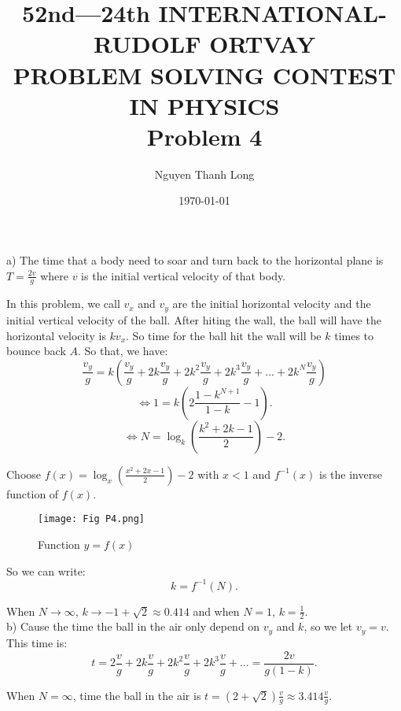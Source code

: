 \documentclass[12pt]{article}
\title{52nd—24th INTERNATIONAL-RUDOLF ORTVAY \\ PROBLEM SOLVING CONTEST IN PHYSICS \\ Problem 4}
\author{Nguyen Thanh Long}
\date{\today}
\begin{document}
	
\maketitle
	
a) The time that a body need to soar and turn back to the horizontal plane is $T = \frac{2v}{g}$ where $v$ is the initial vertical velocity of that body.

In this problem, we call $v_x$ and $v_y$ are the initial horizontal velocity and the initial vertical velocity of the ball. After hiting the wall, the ball will have the horizontal velocity is $k v_x$. So time for the ball hit the wall will be $k$ times to bounce back $A$. So that, we have:
$$ \frac{v_y}{g} = k \left( \frac{v_y}{g} + 2k \frac{v_y}{g} + 2 k^2 \frac{v_y}{g} + 2 k^3 \frac{v_y}{g} + ... + 2 k^N \frac{v_y}{g} \right) $$
$$ \Leftrightarrow 1 = k \left( 2 \frac{1 - k^{N+1}}{1 - k} - 1 \right) .$$
$$ \Leftrightarrow N = \log_k \left( \frac{k^2 + 2k - 1}{2} \right) - 2 .$$

Choose $f(x) = \log_x \left( \frac{x^2 + 2x - 1}{2} \right) -2$ with $x<1$ and $f^{-1}(x)$ is the inverse function of $f(x)$. 

\begin{figure}[!htb]
	\centering
	\texttt{[image: Fig P4.png]}
	\caption{ Function $y=f(x)$ }
\end{figure}	

So we can write:
$$k = f^{-1}(N).$$

When $N \rightarrow \infty$, $k \rightarrow -1 + \sqrt{2} \approx 0.414 $ and when $N=1$, $k= \frac{1}{2}$. \\

b) Cause the time the ball in the air only depend on $v_y$ and $k$, so we let $v_y=v$. This time is:
$$ t = 2\frac{v}{g} + 2k \frac{v}{g} + 2 k^2 \frac{v}{g} + 2 k^3 \frac{v}{g} + ... = \frac{2v}{g ( 1 - k )}  .$$

When $N= \infty$, time the ball in the air is $t= \left( 2 +\sqrt{2} \right) \frac{v}{g} \approx 3.414 \frac{v}{g} .$
	
\end{document}

